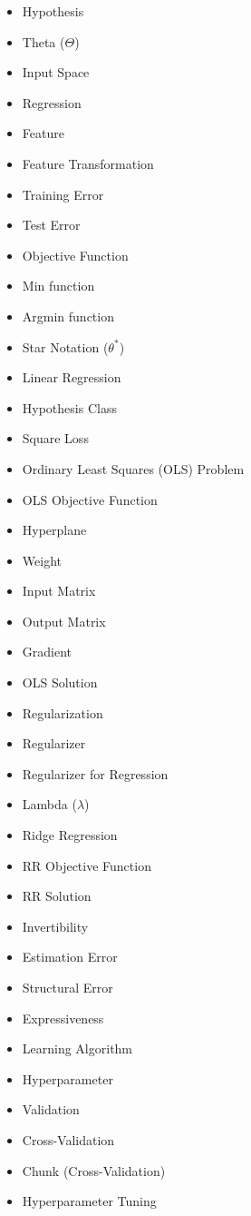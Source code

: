     \begin{itemize}
        \item Hypothesis
        \item Theta ($\Theta$)
        \item Input Space
        \item Regression
        \item Feature
        \item Feature Transformation
        \item Training Error
        \item Test Error
        \item Objective Function
        \item Min function
        \item Argmin function
        \item Star Notation ($\theta^*$)
        \item Linear Regression
        \item Hypothesis Class
        \item Square Loss
        \item Ordinary Least Squares (OLS) Problem
        \item OLS Objective Function
        \item Hyperplane
        \item Weight
        \item Input Matrix
        \item Output Matrix
        \item Gradient
        \item OLS Solution
        \item Regularization
        \item Regularizer
        \item Regularizer for Regression
        \item Lambda ($\lambda$)
        \item Ridge Regression
        \item RR Objective Function
        \item RR Solution
        \item Invertibility
        \item Estimation Error
        \item Structural Error
        \item Expressiveness
        \item Learning Algorithm
        \item Hyperparameter
        \item Validation
        \item Cross-Validation
        \item Chunk (Cross-Validation)
        \item Hyperparameter Tuning
    \end{itemize}
        
        
        






